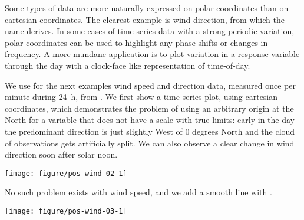 \documentclass[krantz2]{krantz}\usepackage{knitr}%
\begin{document}
Some types of data are more naturally expressed on polar coordinates than on cartesian coordinates. The clearest example is wind direction, from which the name derives. In some cases of time series data with a strong periodic variation, polar coordinates can be used to highlight any phase shifts or changes in frequency. A more mundane application is to plot variation in a response variable through the day with a clock-face like representation of time-of-day.

We use for the next examples wind speed and direction data, measured once per minute during 24~h, from .
We first show a time series plot, using cartesian coordinates, which demonstrates the problem of using an arbitrary origin at the North for a variable that does not have a scale with true limits: early in the day the predominant direction is just slightly West of 0 degrees North and the cloud of observations gets artificially split. We can also observe a clear change in wind direction soon after solar noon.

\begin{knitrout}\footnotesize
{}\color{fgcolor}

{\centering \texttt{[image: figure/pos-wind-02-1]} 

}



\end{knitrout}

No such problem exists with wind speed, and we add a smooth line with .

\begin{knitrout}\footnotesize
{}\color{fgcolor}

{\centering \texttt{[image: figure/pos-wind-03-1]} 

}



\end{knitrout}
\end{document}
